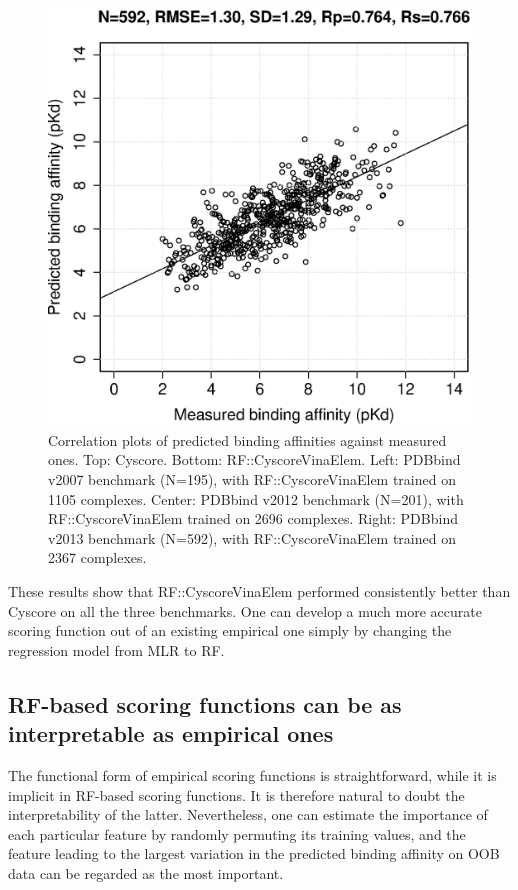 \documentclass[journal=jacsat,manuscript=article]{achemso}
\begin{document}
\begin{figure}[ht!]
\endminipage
{}
\includegraphics[width=\linewidth]{../rfcyscore/x46/rf/trn-2367-tst-592-yp.eps}
\endminipage
\caption{Correlation plots of predicted binding affinities against measured ones. Top: Cyscore. Bottom: RF::CyscoreVinaElem. Left: PDBbind v2007 benchmark (N=195), with RF::CyscoreVinaElem trained on 1105 complexes. Center: PDBbind v2012 benchmark (N=201), with RF::CyscoreVinaElem trained on 2696 complexes. Right: PDBbind v2013 benchmark (N=592), with RF::CyscoreVinaElem trained on 2367 complexes.}
\label{fig:cor}
\end{figure}

These results show that RF::CyscoreVinaElem performed consistently better than Cyscore on all the three benchmarks. One can develop a much more accurate scoring function out of an existing empirical one simply by changing the regression model from MLR to RF.

\subsection{RF-based scoring functions can be as interpretable as empirical ones} %

The functional form of empirical scoring functions is straightforward, while it is implicit in RF-based scoring functions. It is therefore natural to doubt the interpretability of the latter. Nevertheless, one can estimate the importance of each particular feature by randomly permuting its training values, and the feature leading to the largest variation in the predicted binding affinity on OOB data can be regarded as the most important.
\end{document}
